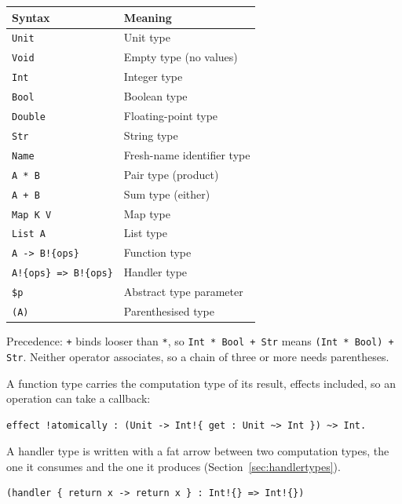\documentclass[11pt,a4paper]{article}
\begin{document}
\begin{center}
\begin{tabular}{ll}
\toprule
\textbf{Syntax} & \textbf{Meaning} \\
\midrule
\texttt{Unit}        & Unit type \\
\texttt{Void}        & Empty type (no values) \\
\texttt{Int}         & Integer type \\
\texttt{Bool}        & Boolean type \\
\texttt{Double}      & Floating-point type \\
\texttt{Str}         & String type \\
\texttt{Name}        & Fresh-name identifier type \\
\texttt{A * B}       & Pair type (product) \\
\texttt{A + B}       & Sum type (either) \\
\texttt{Map K V}     & Map type \\
\texttt{List A}      & List type \\
\texttt{A -> B!\{ops\}} & Function type \\
\texttt{A!\{ops\} => B!\{ops\}} & Handler type \\
\texttt{\$p}         & Abstract type parameter \\
\texttt{(A)}         & Parenthesised type \\
\bottomrule
\end{tabular}
\end{center}

Precedence: \texttt{+} binds looser than \texttt{*}, so
\texttt{Int * Bool + Str} means \texttt{(Int * Bool) + Str}.  Neither operator
associates, so a chain of three or more needs parentheses.

A function type carries the computation type of its result, effects included,
so an operation can take a callback:

\begin{lstlisting}
effect !atomically : (Unit -> Int!{ get : Unit ~> Int }) ~> Int.
\end{lstlisting}

A handler type is written with a fat arrow between two computation types,
the one it consumes and the one it produces (Section~\ref{sec:handlertypes}).

\begin{lstlisting}
(handler { return x -> return x } : Int!{} => Int!{})
\end{lstlisting}
\end{document}
